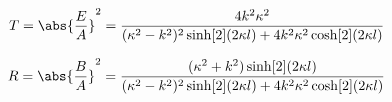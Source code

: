 \begin{equation}
T = \abs{\frac{E}{A}}^2 = \frac{4k^2\kappa ^2}{(\kappa ^2 - k^2)^2 \sinh[2](2\kappa l) + 4k^2\kappa ^2\cosh[2](2\kappa l)}
\end{equation}

\begin{equation}
R = \abs{\frac{B}{A}}^2 = \frac{(\kappa ^2 + k^2) \sinh[2](2\kappa l)}{(\kappa ^2 - k^2)^2 \sinh[2](2\kappa l) + 4k^2\kappa ^2\cosh[2](2\kappa l)}
\end{equation}
